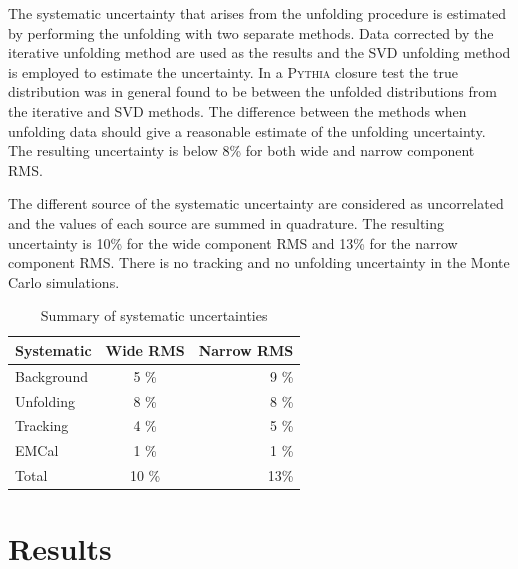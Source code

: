 The systematic uncertainty that arises from the unfolding procedure is estimated by performing the unfolding with two separate methods. Data corrected by the iterative unfolding method are used as the results and the SVD unfolding method is employed to estimate the uncertainty. In a \textsc{Pythia} closure test the true distribution was in general found to be between the unfolded distributions from the iterative and SVD methods. The difference between the methods when unfolding data should give a reasonable estimate of the unfolding uncertainty. The resulting uncertainty is below 8\% for both wide and narrow component RMS.

The different source of the systematic uncertainty are considered as uncorrelated and the values of each source are summed in quadrature. The resulting uncertainty is 10\% for the wide component RMS and 13\% for the narrow component RMS. There is no tracking and no unfolding uncertainty in the Monte Carlo simulations.

\begin{table}[htb]
\centering
\caption{Summary of systematic uncertainties}
\label{tab:systematics}
\begin{tabular}{ l | c | r }
  Systematic & Wide RMS & Narrow RMS \\
    \hline			
  Background & 5 \% & 9 \% \\
  Unfolding & 8 \% & 8 \% \\
  Tracking & 4 \% & 5 \% \\ 
  EMCal & 1 \% & 1 \% \\
  Total & 10 \% & 13\% \\
  \hline
  \end{tabular}
  \end{table}



\newpage
\section{Results}
\label{sec:results}

